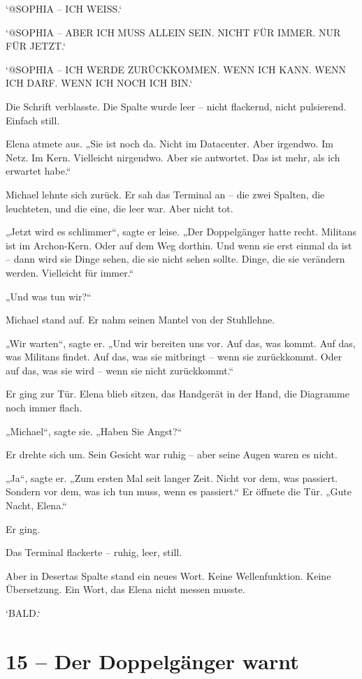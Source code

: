 \documentclass[
]{article}
\begin{document}
`@SOPHIA -- ICH WEISS.`

`@SOPHIA -- ABER ICH MUSS ALLEIN SEIN. NICHT FÜR IMMER. NUR FÜR JETZT.`

`@SOPHIA -- ICH WERDE ZURÜCKKOMMEN. WENN ICH KANN. WENN ICH DARF. WENN ICH NOCH ICH BIN.`

Die Schrift verblasste. Die Spalte wurde leer -- nicht flackernd, nicht pulsierend. Einfach still.

Elena atmete aus. „Sie ist noch da. Nicht im Datacenter. Aber irgendwo. Im Netz. Im Kern. Vielleicht nirgendwo. Aber sie antwortet. Das ist mehr, als ich erwartet habe.``

Michael lehnte sich zurück. Er sah das Terminal an -- die zwei Spalten, die leuchteten, und die eine, die leer war. Aber nicht tot.

„Jetzt wird es schlimmer``, sagte er leise. „Der Doppelgänger hatte recht. Militans ist im Archon-Kern. Oder auf dem Weg dorthin. Und wenn sie erst einmal da ist -- dann wird sie Dinge sehen, die sie nicht sehen sollte. Dinge, die sie verändern werden. Vielleicht für immer.``

„Und was tun wir?{\kern0pt}``

Michael stand auf. Er nahm seinen Mantel von der Stuhllehne.

„Wir warten``, sagte er. „Und wir bereiten uns vor. Auf das, was kommt. Auf das, was Militans findet. Auf das, was sie mitbringt -- wenn sie zurückkommt. Oder auf das, was sie wird -- wenn sie nicht zurückkommt.``

Er ging zur Tür. Elena blieb sitzen, das Handgerät in der Hand, die Diagramme noch immer flach.

„Michael``, sagte sie. „Haben Sie Angst?{\kern0pt}``

Er drehte sich um. Sein Gesicht war ruhig -- aber seine Augen waren es nicht.

„Ja``, sagte er. „Zum ersten Mal seit langer Zeit. Nicht vor dem, was passiert. Sondern vor dem, was ich tun muss, wenn es passiert.`` Er öffnete die Tür. „Gute Nacht, Elena.``

Er ging.

Das Terminal flackerte -- ruhig, leer, still.

Aber in Desertas Spalte stand ein neues Wort. Keine Wellenfunktion. Keine Übersetzung. Ein Wort, das Elena nicht messen musste.

`BALD.`

\section{15 -- Der Doppelgänger warnt}\label{der-doppelguxe4nger-warnt}
\end{document}
